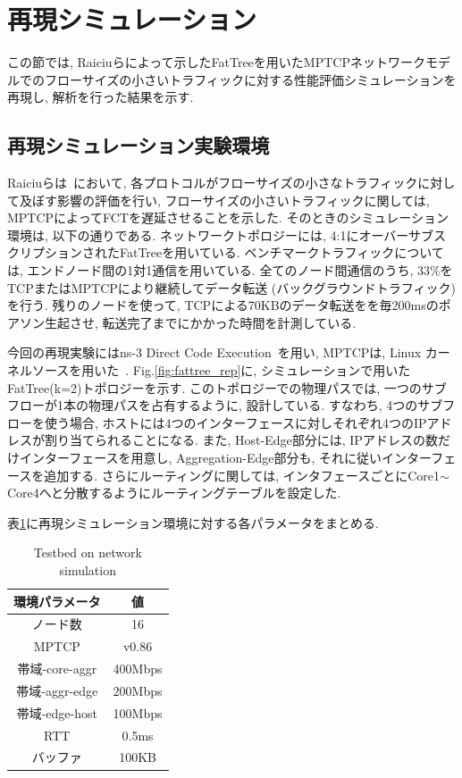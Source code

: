 \section{再現シミュレーション}
\label{reproduction_simulation}
この節では,
Raiciuらによって示したFatTreeを用いたMPTCPネットワークモデルでのフローサイズの小さいトラフィックに対する性能評価シミュレーションを再現し,
解析を行った結果を示す.

\subsection{再現シミュレーション実験環境}
Raiciuらは~\cite{improving}において, 各プロトコルがフローサイズの小さなトラフィックに対して及ぼす影響の評価を行い,
フローサイズの小さいトラフィックに関しては, MPTCPによってFCTを遅延させることを示した.
そのときのシミュレーション環境は, 以下の通りである.
ネットワークトポロジーには, 4:1にオーバーサブスクリプションされたFatTreeを用いている.
ベンチマークトラフィックについては, エンドノード間の1対1通信を用いている.
全てのノード間通信のうち, 33\%をTCPまたはMPTCPにより継続してデータ転送 (バックグラウンドトラフィック)を行う.
残りのノードを使って, TCPによる70KBのデータ転送をを毎200msのポアソン生起させ, 転送完了までにかかった時間を計測している.

今回の再現実験にはns-3 Direct Code Execution~\cite{ns3}を用い, MPTCPは, Linux
カーネルソースを用いた~\cite{mptcp_linux}.
Fig.\ref{fig:fattree_rep}に, シミュレーションで用いたFatTree(k=2)トポロジーを示す.
このトポロジーでの物理パスでは, 一つのサブフローが1本の物理パスを占有するように, 設計している.
すなわち, 4つのサブフローを使う場合, ホストには4つのインターフェースに対しそれぞれ4つのIPアドレスが割り当てられることになる.
また, Host-Edge部分には, IPアドレスの数だけインターフェースを用意し, Aggregation-Edge部分も,
それに従いインターフェースを追加する.
さらにルーティングに関しては, インタフェースごとにCore1$\sim$Core4へと分散するようにルーティングテーブルを設定した.

表\ref{table:testbed}に再現シミュレーション環境に対する各パラメータをまとめる.
\begin{table}[t]
\begin{center}
\caption{Testbed on network simulation}
\begin{tabular}{c|c}
\hline
環境パラメータ & 値 \\ \hline \hline
ノード数 & 16 \\
MPTCP & v0.86 \\
帯域-core-aggr & 400Mbps \\
帯域-aggr-edge & 200Mbps \\
帯域-edge-host & 100Mbps \\
RTT & 0.5ms\\
バッファ & 100KB \\
\hline
\end{tabular}
\label{table:testbed}
\end{center}
\end{table}

